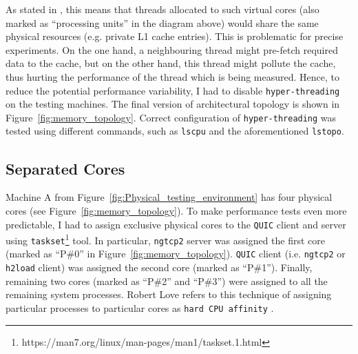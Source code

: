 \documentclass[12pt,a4paper,twoside,openright]{report}
\begin{document}
As stated in \cite{hyperthreading_book}, this means that threads allocated to such virtual cores (also marked as \enquote{processing units} in the diagram above) would share the same physical resources (e.g. private L1 cache entries).
This is problematic for precise experiments.
On the one hand, a neighbouring thread might pre-fetch required data to the cache, but on the other hand, this thread might pollute the cache, thus hurting the performance of the thread which is being measured.
Hence, to reduce the potential performance variability, I had to disable \texttt{hyper-threading} on the testing machines.
The final version of architectural topology is shown in Figure~\ref{fig:memory_topology}. 
Correct configuration of \texttt{hyper-threading} was tested using different commands, such as \texttt{lscpu} and the aforementioned \texttt{lstopo}. 

    
    
\subsection{Separated Cores} \label{SeparatedCores_Subsection_Tag}
Machine A from Figure~\ref{fig:Physical_testing_environment} has four physical cores (see Figure~\ref{fig:memory_topology}).
To make performance tests even more predictable, I had to assign exclusive physical cores to the \texttt{QUIC} client and server using \texttt{taskset}\footnote{https://man7.org/linux/man-pages/man1/taskset.1.html} tool.
In particular, \texttt{ngtcp2} server was assigned the first core (marked as \enquote{P\#0} in Figure~\ref{fig:memory_topology}).
\texttt{QUIC} client (i.e. \texttt{ngtcp2} or \texttt{h2load} client) was assigned the second core (marked as \enquote{P\#1}).
Finally, remaining two cores (marked as \enquote{P\#2} and \enquote{P\#3}) were assigned to all the remaining system processes.
Robert Love refers to this technique of assigning particular processes to particular cores as \texttt{hard CPU affinity} \cite{CPU_Affinity}.
\end{document}
